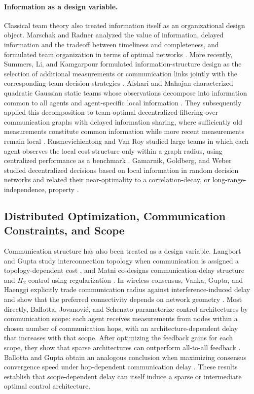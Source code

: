 \documentclass[11pt]{article}
\begin{document}
\paragraph{Information as a design variable.}
Classical team theory also treated information itself as an organizational design object. Marschak and Radner analyzed the value of information, delayed information and the tradeoff between timeliness and completeness, and formulated team organization in terms of optimal networks \cite{marschak1972economic}. More recently, Summers, Li, and Kamgarpour formulated information-structure design as the selection of additional measurements or communication links jointly with the corresponding team decision strategies \cite{summers2017information}. Afshari and Mahajan characterized quadratic Gaussian static teams whose observations decompose into information common to all agents and agent-specific local information \cite{afshari2017static}. They subsequently applied this decomposition to team-optimal decentralized filtering over communication graphs with delayed information sharing, where sufficiently old measurements constitute common information while more recent measurements remain local \cite{afshari2018team}. Rusmevichientong and Van Roy studied large teams in which each agent observes the local cost structure only within a graph radius, using centralized performance as a benchmark \cite{rusmevichientong2003decentralized}. Gamarnik, Goldberg, and Weber studied decentralized decisions based on local information in random decision networks and related their near-optimality to a correlation-decay, or long-range-independence, property \cite{gamarnik2014correlation}.

\subsection{Distributed Optimization, Communication Constraints, and Scope}
\label{subsec:related_distributed_control}

Communication structure has also been treated as a design variable. Langbort
and Gupta study interconnection topology when communication is assigned a
topology-dependent cost \cite{langbort2009minimal}, and Matni co-designs
communication-delay structure and $H_2$ control using regularization
\cite{matni2017communication}. In wireless consensus, Vanka, Gupta, and Haenggi
explicitly trade communication radius against interference-induced delay
and show that the preferred connectivity depends on network geometry
\cite{vanka2010power}. Most directly, Ballotta, Jovanovi\'c, and Schenato
parameterize control architectures by communication scope: each agent receives
measurements from nodes within a chosen number of communication hops, with an
architecture-dependent delay that increases with that scope. After optimizing
the feedback gains for each scope, they show that sparse architectures can
outperform all-to-all feedback \cite{ballotta2023latency}. Ballotta and Gupta
obtain an analogous conclusion when maximizing consensus convergence speed
under hop-dependent communication delay \cite{ballotta2023sparser}. These
results establish that scope-dependent delay can itself induce a sparse or
intermediate optimal control architecture.
\end{document}
